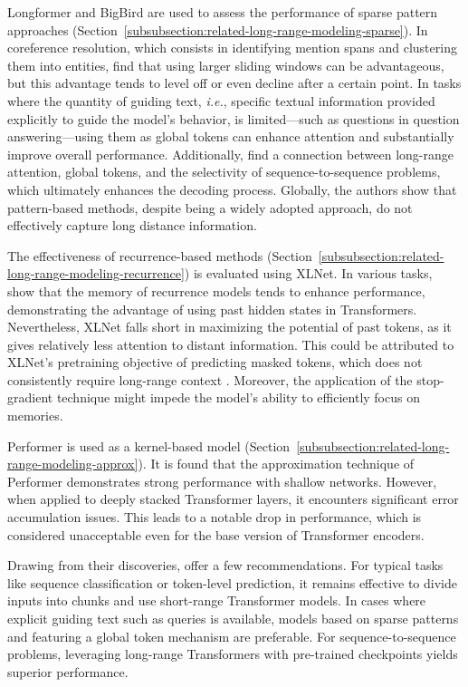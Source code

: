 Longformer and BigBird are used to assess the performance of sparse pattern approaches (Section~\ref{subsubsection:related-long-range-modeling-sparse}). In coreference resolution, which consists in identifying mention spans and clustering them into entities, \citet{qin2022nlp} find that using larger sliding windows can be advantageous, but this advantage tends to level off or even decline after a certain point. In tasks where the quantity of guiding text, \textit{i.e.}, specific textual information provided explicitly to guide the model's behavior, is limited—such as questions in question answering—using them as global tokens can enhance attention and substantially improve overall performance. Additionally, \citet{qin2022nlp} find a connection between long-range attention, global tokens, and the selectivity of sequence-to-sequence problems, which ultimately enhances the decoding process. Globally, the authors show that pattern-based methods, despite being a widely adopted approach, do not effectively capture long distance information.

The effectiveness of recurrence-based methods (Section~\ref{subsubsection:related-long-range-modeling-recurrence}) is evaluated using XLNet. In various tasks, \citet{qin2022nlp} show that the memory of recurrence models tends to enhance performance, demonstrating the advantage of using past hidden states in Transformers. Nevertheless, XLNet falls short in maximizing the potential of past tokens, as it gives relatively less attention to distant information. This could be attributed to XLNet's pretraining objective of predicting masked tokens, which does not consistently require long-range context \citep{sun2021long}. Moreover, the application of the stop-gradient technique might impede the model's ability to efficiently focus on memories.

Performer is used as a kernel-based model (Section~\ref{subsubsection:related-long-range-modeling-approx}). It is found that the approximation technique of Performer demonstrates strong performance with shallow networks. However, when applied to deeply stacked Transformer layers, it encounters significant  error accumulation issues. This leads to a notable drop in performance, which is considered unacceptable even for the base version of Transformer encoders. 

Drawing from their discoveries, \citet{qin2022nlp} offer a few recommendations. For typical tasks like sequence classification or token-level prediction, it remains effective to divide inputs into chunks and use short-range Transformer models. In cases where explicit guiding text such as queries is available, models based on sparse patterns and featuring a global token mechanism are preferable. For sequence-to-sequence problems, leveraging long-range Transformers with pre-trained checkpoints yields superior performance. 


